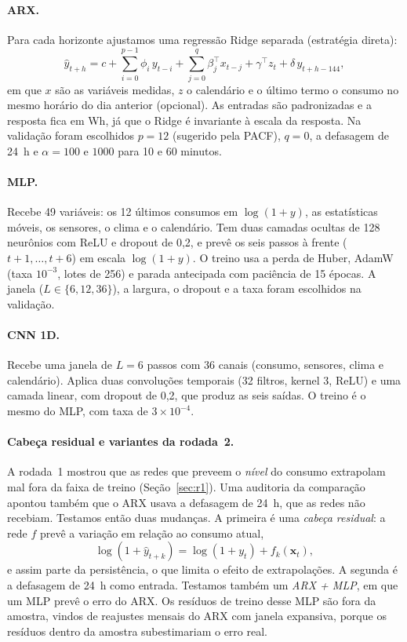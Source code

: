 \documentclass[11pt,a4paper]{article}
\begin{document}
\paragraph{ARX.} Para cada horizonte ajustamos uma regressão Ridge separada (estratégia direta):
\begin{equation*}
\hat y_{t+h} = c + \sum_{i=0}^{p-1}\phi_i\, y_{t-i} + \sum_{j=0}^{q}\beta_j^\top x_{t-j} + \gamma^\top z_t + \delta\, y_{t+h-144},
\end{equation*}
em que $x$ são as variáveis medidas, $z$ o calendário e o último termo o consumo no mesmo horário do dia anterior (opcional). As entradas são padronizadas e a resposta fica em Wh, já que o Ridge é invariante à escala da resposta. Na validação foram escolhidos $p=12$ (sugerido pela PACF), $q=0$, a defasagem de 24~h e $\alpha = 100$ e $1000$ para 10 e 60 minutos.

\paragraph{MLP.} Recebe 49 variáveis: os 12 últimos consumos em $\log(1+y)$, as estatísticas móveis, os sensores, o clima e o calendário. Tem duas camadas ocultas de 128 neurônios com ReLU e dropout de 0,2, e prevê os seis passos à frente ($t+1, \dots, t+6$) em escala $\log(1+y)$. O treino usa a perda de Huber, AdamW (taxa $10^{-3}$, lotes de 256) e parada antecipada com paciência de 15 épocas. A janela ($L \in \{6, 12, 36\}$), a largura, o dropout e a taxa foram escolhidos na validação.

\paragraph{CNN 1D.} Recebe uma janela de $L=6$ passos com 36 canais (consumo, sensores, clima e calendário). Aplica duas convoluções temporais (32 filtros, kernel 3, ReLU) e uma camada linear, com dropout de 0,2, que produz as seis saídas. O treino é o mesmo do MLP, com taxa de $3\times 10^{-4}$.

\paragraph{Cabeça residual e variantes da rodada~2.} A rodada~1 mostrou que as redes que preveem o \emph{nível} do consumo extrapolam mal fora da faixa de treino (Seção~\ref{sec:r1}). Uma auditoria da comparação apontou também que o ARX usava a defasagem de 24~h, que as redes não recebiam. Testamos então duas mudanças. A primeira é uma \emph{cabeça residual}: a rede $f$ prevê a variação em relação ao consumo atual,
\begin{equation*}
\log(1+\hat y_{t+k}) = \log(1+y_t) + f_k(\mathbf{x}_t),
\end{equation*}
e assim parte da persistência, o que limita o efeito de extrapolações. A segunda é a defasagem de 24~h como entrada. Testamos também um \emph{ARX + MLP}, em que um MLP prevê o erro do ARX. Os resíduos de treino desse MLP são fora da amostra, vindos de reajustes mensais do ARX com janela expansiva, porque os resíduos dentro da amostra subestimariam o erro real.
\end{document}
